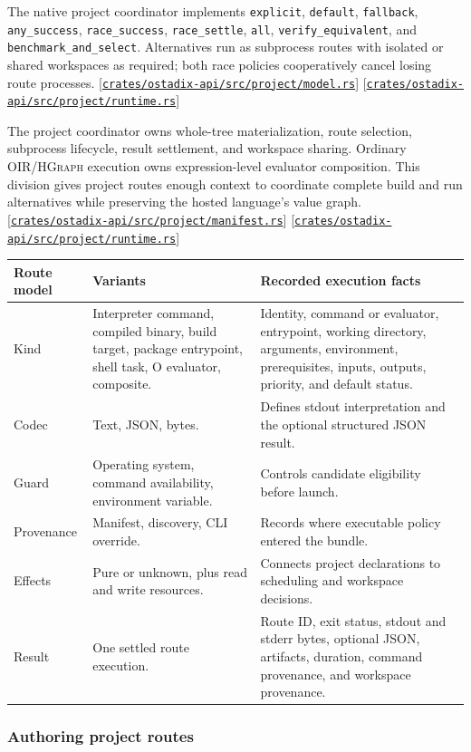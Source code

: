 \documentclass[11pt,oneside]{article}
\newcommand{\oir}{{\mdseries\textsc{OIR}}}
\newcommand{\hgraph}{{\mdseries\textsc{HGraph}}}
\newcommand{\src}[1]{\textcolor{OSlate}{\scriptsize[\href{https://github.com/lostadi/OSTADIX/blob/c0b02c326b2329a95ba52447c7180bc93957cd57/#1}{\nolinkurl{#1}}]}\allowbreak}
\begin{document}
The native project coordinator implements \texttt{explicit},
\texttt{default}, \texttt{fallback}, \texttt{any\_success},
\texttt{race\_success}, \texttt{race\_settle}, \texttt{all},
\texttt{verify\_equivalent}, and \texttt{benchmark\_and\_select}. Alternatives
run as subprocess routes with isolated or shared workspaces as required; both
race policies cooperatively cancel losing route processes.
\src{crates/ostadix-api/src/project/model.rs}
\src{crates/ostadix-api/src/project/runtime.rs}

The project coordinator owns whole-tree materialization, route selection,
subprocess lifecycle, result settlement, and workspace sharing. Ordinary
\oir{}/\hgraph{} execution owns expression-level evaluator composition. This
division gives project routes enough context to coordinate complete build and
run alternatives while preserving the hosted language's value graph.
\src{crates/ostadix-api/src/project/manifest.rs}
\src{crates/ostadix-api/src/project/runtime.rs}

\begin{longtable}{P{0.22\textwidth} P{0.28\textwidth} P{0.42\textwidth}}
\toprule
\textbf{Route model} & \textbf{Variants} & \textbf{Recorded execution facts} \\
\midrule
\endhead
Kind &
Interpreter command, compiled binary, build target, package entrypoint, shell
task, O evaluator, composite. &
Identity, command or evaluator, entrypoint, working directory, arguments,
environment, prerequisites, inputs, outputs, priority, and default status. \\
Codec &
Text, JSON, bytes. &
Defines stdout interpretation and the optional structured JSON result. \\
Guard &
Operating system, command availability, environment variable. &
Controls candidate eligibility before launch. \\
Provenance &
Manifest, discovery, CLI override. &
Records where executable policy entered the bundle. \\
Effects &
Pure or unknown, plus read and write resources. &
Connects project declarations to scheduling and workspace decisions. \\
Result &
One settled route execution. &
Route ID, exit status, stdout and stderr bytes, optional JSON, artifacts,
duration, command provenance, and workspace provenance. \\
\bottomrule
\end{longtable}

\subsubsection{Authoring project routes}
\end{document}
